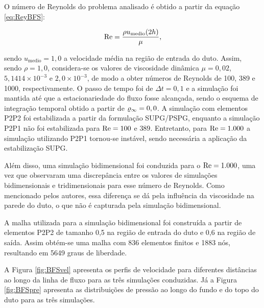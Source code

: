 O número de Reynolds do problema analisado é obtido a partir da equação \eqref{eq:ReyBFS}:

\begin{equation}
    \mathrm{Re}=\frac{\rho u_\mathrm{medio}(2h)}{\mu}\text{,}
    \label{eq:ReyBFS}
\end{equation}

\noindent sendo $u_\mathrm{medio}=1,0$ a velocidade média na região de entrada do duto. Assim, sendo $\rho=1,0$, considera-se os valores de viscosidade dinâmica $\mu=0,02$, $5,1414\times10^{-3}$ e $2,0\times10^{-3}$, de modo a obter números de Reynolds de 100, 389 e 1000, respectivamente. O passo de tempo foi de $\Delta t=0,1$ e a simulação foi mantida até que a estacionariedade do fluxo fosse alcançada, sendo o esquema de integração temporal obtido a partir de $\varrho_\infty=0,0$. A simulação com elementos P2P2 foi estabilizada a partir da formulação SUPG/PSPG, enquanto a simulação P2P1 não foi estabilizada para $\mathrm{Re}=100$ e $389$. Entretanto, para $\mathrm{Re}=1.000$ a simulação utilizando P2P1 tornou-se instável, sendo necessária a aplicação da estabilização SUPG.

Além disso, uma simulação bidimensional foi conduzida para o $\mathrm{Re}=1.000$, uma vez que  observaram uma discrepância entre os valores de simulações bidimensionais e tridimensionais para esse número de Reynolds. Como mencionado pelos autores, essa diferença se dá pela influência da viscosidade na parede do duto, o que não é capturada pela simulação bidimensional.

A malha utilizada para a simulação bidimensional foi construída a partir de elementos P2P2 de tamanho 0,5 na região de entrada do duto e 0,6 na região de saída. Assim obtém-se uma malha com 836 elementos finitos e 1883 nós, resultando em 5649 graus de liberdade.

A Figura \ref{fig:BFSvel} apresenta os perfis de velocidade para diferentes distâncias ao longo da linha de fluxo para as três simulações conduzidas. Já a Figura \ref{fig:BFSpre} apresenta as distribuições de pressão ao longo do fundo e do topo do duto para as três simulações.

